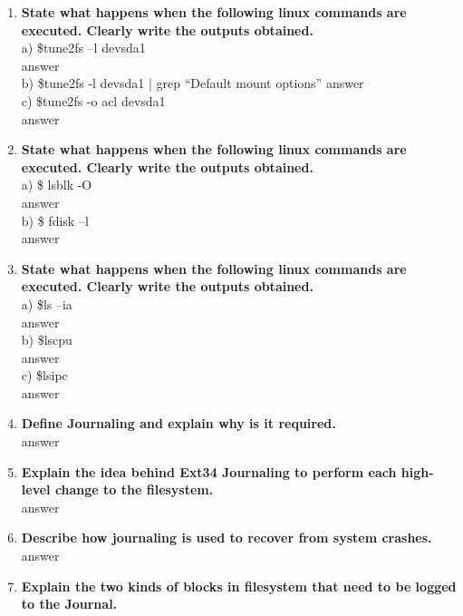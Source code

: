 \documentclass[a4paper,12pt]{article}
\begin{document}
\begin{flushleft}
\begin{enumerate}
a) \$ dumpe2fs -h \/dev\/sda1\\
{\color{red}answer}\\
b) \$ dumpe2fs -g \/dev\/sda1\\
{\color{red}answer}\\
\item \textbf{ State what happens when the following linux commands are executed. Clearly write the outputs obtained.}\\
a) \$tune2fs –l \/dev\/sda1\\
{\color{red}answer}\\
b) \$tune2fs -l \/dev\/sda1 | grep “Default mount options”
{\color{red}answer}\\
c) \$tune2fs -o acl \/dev\/sda1\\
{\color{red}answer}\\
\item \textbf{ State what happens when the following linux commands are executed. Clearly write the outputs obtained.}\\
a) \$ lsblk -O\\
{\color{red}answer}\\
b) \$ fdisk –l\\
{\color{red}answer}\\
\item \textbf{ State what happens when the following linux commands are executed. Clearly write the outputs obtained.}\\
a) \$ls –ia\\
{\color{red}answer}\\
b) \$lscpu\\
{\color{red}answer}\\
c) \$lsipc\\
{\color{red}answer}\\
\item \textbf{ Define Journaling and explain why is it required.}\\
{\color{red}answer}\\
\item \textbf{ Explain the idea behind Ext3\/4 Journaling to perform each high-level change to the filesystem.}\\
{\color{red}answer}\\
\item \textbf{ Describe how journaling is used to recover from system crashes.}\\
{\color{red}answer}\\
\item \textbf{ Explain the two kinds of blocks in filesystem that need to be logged to the Journal.}\\

\end{enumerate}
\end{flushleft}
\end{document}
